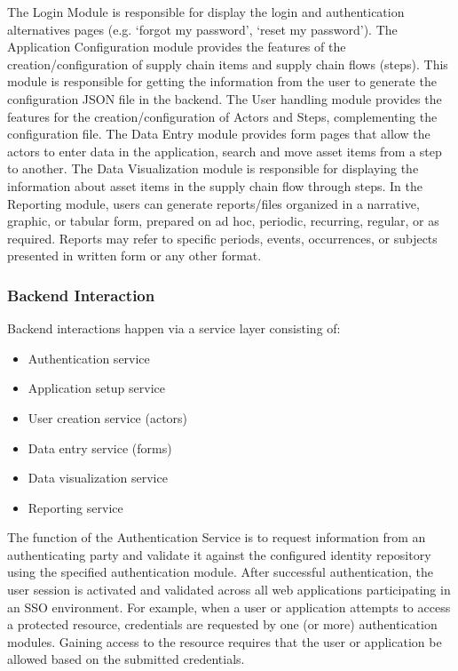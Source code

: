 The Login Module is responsible for display the login and authentication alternatives pages (e.g. ‘forgot my password’, ‘reset my password’). The Application Configuration module provides the features of the creation/configuration of supply chain items and supply chain flows (steps). This module is responsible for getting the information from the user to generate the configuration JSON file in the backend. The User handling module provides the features for the creation/configuration of Actors and Steps, complementing the configuration file. The Data Entry module provides form pages that allow the actors to enter data in the application, search and move asset items from a step to another. The Data Visualization module is responsible for displaying the information about asset items in the supply chain flow through steps. In the Reporting module, users can generate reports/files organized in a narrative, graphic, or tabular form, prepared on ad hoc, periodic, recurring, regular, or as required. Reports may refer to specific periods, events, occurrences, or subjects presented in written form or any other format.


\subsubsection{Backend Interaction}\label{sec:BackendInteraction}
Backend interactions happen via a service layer consisting of:

\begin{itemize}
\item Authentication service
\item Application setup service
\item User creation service (actors)
\item Data entry service (forms)
\item Data visualization service
\item Reporting service
\end{itemize}

The function of the Authentication Service is to request information from an authenticating party and validate it against the configured identity repository using the specified authentication module. After successful authentication, the user session is activated and validated across all web applications participating in an SSO environment. For example, when a user or application attempts to access a protected resource, credentials are requested by one (or more) authentication modules. Gaining access to the resource requires that the user or application be allowed based on the submitted credentials.

